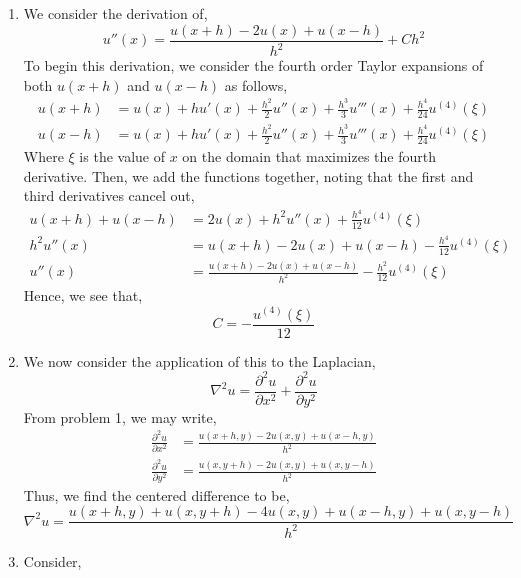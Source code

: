 \documentclass[letterpaper,10pt]{article}
\begin{document}
\begin{enumerate}
\item We consider the derivation of,
\[u''(x)=\frac{u(x+h)-2u(x)+u(x-h)}{h^2}+Ch^2\]
To begin this derivation, we consider the fourth order Taylor expansions of both $u(x+h)$ and $u(x-h)$ as follows,
\begin{align*}
u(x+h) &= u(x)+hu'(x)+\frac{h^2}{2}u''(x)+\frac{h^3}{3}u'''(x)+\frac{h^4}{24}u^{(4)}(\xi)\\
u(x-h) &= u(x)+hu'(x)+\frac{h^2}{2}u''(x)+\frac{h^3}{3}u'''(x)+\frac{h^4}{24}u^{(4)}(\xi)
\end{align*}
Where $\xi$ is the value of $x$ on the domain that maximizes the fourth derivative. Then, we add the functions together, noting that the first and third derivatives cancel out,
\begin{align*}
u(x+h)+u(x-h) &= 2u(x) +h^2u''(x)+\frac{h^4}{12}u^{(4)}(\xi)\\
h^2u''(x) &=u(x+h)-2u(x)+u(x-h)-\frac{h^4}{12}u^{(4)}(\xi)\\
u''(x) &= \frac{u(x+h)-2u(x)+u(x-h)}{h^2}-\frac{h^2}{12}u^{(4)}(\xi)
\end{align*}
Hence, we see that,
\[C=-\frac{u^{(4)}(\xi)}{12}\]
\item We now consider the application of this to the Laplacian,
\[\nabla^2 u = \frac{\partial ^2 u}{\partial x^2}+ \frac{\partial ^2 u}{\partial y^2}\]
From problem 1, we may write,
\begin{align*}
\frac{\partial ^2 u}{\partial x^2} &= \frac{u(x+h,y)-2u(x,y)+u(x-h,y)}{h^2}\\
\frac{\partial ^2 u}{\partial y^2} &= \frac{u(x,y+h)-2u(x,y)+u(x,y-h)}{h^2}
\end{align*}
Thus, we find the centered difference to be,
\[\nabla^2 u= \frac{u(x+h,y)+u(x,y+h)-4u(x,y)+u(x-h,y)+u(x,y-h)}{h^2}\]
\item Consider,

\end{enumerate}
\end{document}
